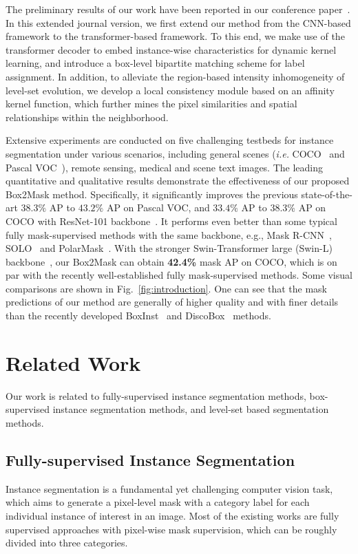 \documentclass[12pt,onecolumn,letterpaper]{article}
\begin{document}
The preliminary results of our work have been reported in our conference paper~\cite{li2022box}. In this extended journal version, we first extend our method from the CNN-based framework to the transformer-based framework. To this end, we make use of the transformer decoder to embed instance-wise characteristics for dynamic kernel learning, and introduce a box-level bipartite matching scheme for label assignment. In addition, to alleviate the region-based intensity inhomogeneity of level-set evolution, we develop a local consistency module based on an affinity kernel function, which further mines the pixel similarities and spatial relationships within the neighborhood. 

Extensive experiments are conducted on five challenging testbeds for instance segmentation under various scenarios, including general scenes (\textit{i.e.} COCO~\cite{lin2014microsoft} and Pascal VOC~\cite{pascalvoc2010}), remote sensing, medical  and scene text images. The leading quantitative and qualitative results demonstrate the effectiveness of our proposed Box2Mask method. Specifically, it significantly improves the previous state-of-the-art $38.3\%$ AP to $43.2\%$ AP on Pascal VOC, and $33.4\%$ AP to $38.3\%$ AP on COCO with ResNet-101 backbone~\cite{he2016deep}.
It performs even better than some typical fully mask-supervised methods with the same backbone, e.g., Mask R-CNN~\cite{iccv2017maskrcnn}, SOLO~\cite{wang2020solo} and PolarMask~\cite{cvpr_2020polarmask}. With the stronger Swin-Transformer large (Swin-L) backbone~\cite{liu2021swin}, our Box2Mask can obtain \textbf{42.4\%} mask AP on COCO, which is on par with the recently well-established fully mask-supervised methods.
Some visual comparisons are shown in Fig.~\ref{fig:introduction}. One can see that the mask predictions of our method are generally of higher quality and with finer details than the recently developed BoxInst~\cite{cvpr2021_boxinst} and DiscoBox~\cite{iccv2021discobox} methods.

\section{Related Work}
Our work is related to fully-supervised instance segmentation methods, box-supervised instance segmentation methods, and level-set based segmentation methods.

\subsection{Fully-supervised Instance Segmentation}
Instance segmentation is a fundamental yet challenging computer vision task, which aims to generate a pixel-level mask with a category label for each individual instance of interest in an image. 
Most of the existing works are fully supervised approaches with pixel-wise mask supervision, which can be roughly divided into three categories. 
\end{document}
